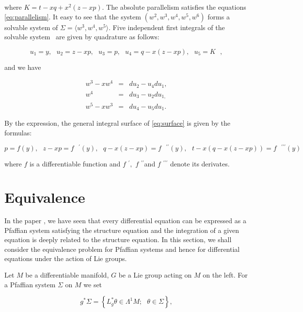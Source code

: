 \documentclass{amsproc}
\theoremstyle{remark}
\numberwithin{equation}{section}
\begin{document}
where $K=t-xq+x^{2}(z-xp).$ The absolute parallelism satisfies the equations
\eqref{eq:parallelism}. It easy to see that the system $\left(
w^{2},w^{3},w^{4},w^{5},w^{6}\right) $ forms a solvable system of $\Sigma
=\langle w^{3},w^{4},w^{5}\rangle .$ Five independent first integrals of the
solvable system \ are given by quadrature as follows:

\begin{equation*}
u_{1}=y,\text{ }u_{2}=z-xp,\text{ }u_{3}=p,\text{ }u_{4}=q-x(z-xp),\text{ }u_{5}=K\text{ },
\end{equation*}

and we have \cite{Ca2}

\begin{eqnarray*}
w^{3}-xw^{4} &=&du_{2}-u_{4}du_{1}, \\
w^{4} &=&du_{3}-u_{2}du_{1,} \\
w^{5}-xw^{3} &=&du_{4}-u_{5}du_{1}.
\end{eqnarray*}

By the expression, the general integral surface of \eqref{eq:surface} is given by the
formulas:

\begin{equation*}
p=f(y),\text{ }z-xp=f\text{ }^{\prime }(y),\text{ }q-x(z-xp)=f\text{ }^{\prime \prime }(y),\text{ }t-x(q-x(z-xp))=f\text{ }^{\prime \prime \prime
}(y)
\end{equation*}

where $f$ is a differentiable function and $f$ $^{\prime },$ $f$ $^{\prime
\prime }$and $f$ $^{\prime \prime \prime }$ denote its derivates.

\section{Equivalence}

In the paper \cite{Ab2} , we have seen that every differential equation can be
expressed as a Pfaffian system satisfying the structure equation and the
integration of a given equation is deeply related to the structure equation.
In this section, we shall consider the equivalence problem for Pfaffian
systems and hence for differential equations under the action of Lie groups.

Let $M$ be a differentiable manifold, $G$ be a Lie group acting on $M$ on
the left. For a Pfaffian system $\Sigma$ on $M$ we set

\begin{equation*}
g^{\ast }\Sigma =\left\{ L_{g}^{\ast }\theta \in \Lambda ^{1}M;\text{ }\theta \in \Sigma \right\} ,
\end{equation*}
\end{document}
